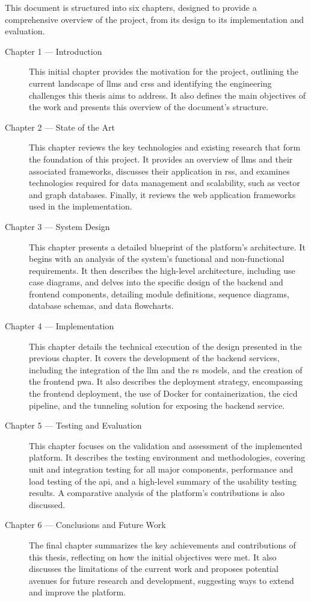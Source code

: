 This document is structured into six chapters, designed to provide a comprehensive overview of the project, from its design to its implementation and evaluation.

\begin{description}
    \item[Chapter 1 --- Introduction] This initial chapter provides the motivation for the project, outlining the current landscape of \acp{llm} and \acp{crs} and identifying the engineering challenges this thesis aims to address. It also defines the main objectives of the work and presents this overview of the document's structure.

    \item[Chapter 2 --- State of the Art] This chapter reviews the key technologies and existing research that form the foundation of this project. It provides an overview of \acp{llm} and their associated frameworks, discusses their application in \acl{rs}s, and examines technologies required for data management and scalability, such as vector and graph databases. Finally, it reviews the web application frameworks used in the implementation.

    \item[Chapter 3 --- System Design] This chapter presents a detailed blueprint of the platform's architecture. It begins with an analysis of the system's functional and non-functional requirements. It then describes the high-level architecture, including use case diagrams, and delves into the specific design of the backend and frontend components, detailing module definitions, sequence diagrams, database schemas, and data flowcharts.

    \item[Chapter 4 --- Implementation] This chapter details the technical execution of the design presented in the previous chapter. It covers the development of the backend services, including the integration of the \ac{llm} and the \acs{rs} models, and the creation of the frontend \ac{pwa}. It also describes the deployment strategy, encompassing the frontend deployment, the use of Docker for containerization, the \ac{cicd} pipeline, and the tunneling solution for exposing the backend service.

    \item[Chapter 5 --- Testing and Evaluation] This chapter focuses on the validation and assessment of the implemented platform. It describes the testing environment and methodologies, covering unit and integration testing for all major components, performance and load testing of the \acs{api}, and a high-level summary of the usability testing results. A comparative analysis of the platform's contributions is also discussed.

    \item[Chapter 6 --- Conclusions and Future Work] The final chapter summarizes the key achievements and contributions of this thesis, reflecting on how the initial objectives were met. It also discusses the limitations of the current work and proposes potential avenues for future research and development, suggesting ways to extend and improve the platform.
\end{description}